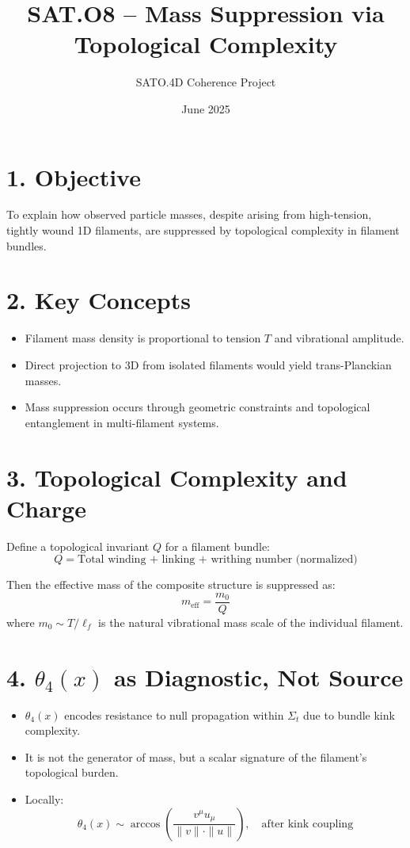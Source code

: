 \documentclass[12pt]{article}
\title{SAT.O8 – Mass Suppression via Topological Complexity}
\author{SATO.4D Coherence Project}
\date{June 2025}
\begin{document}
\maketitle

\section*{1. Objective}

To explain how observed particle masses, despite arising from high-tension, tightly wound 1D filaments, are suppressed by topological complexity in filament bundles.

\section*{2. Key Concepts}

\begin{itemize}
    \item Filament mass density is proportional to tension \( T \) and vibrational amplitude.
    \item Direct projection to 3D from isolated filaments would yield trans-Planckian masses.
    \item Mass suppression occurs through geometric constraints and topological entanglement in multi-filament systems.
\end{itemize}

\section*{3. Topological Complexity and Charge}

Define a topological invariant \( Q \) for a filament bundle:
\[
Q = \text{Total winding + linking + writhing number (normalized)}
\]

Then the effective mass of the composite structure is suppressed as:
\[
m_{\text{eff}} = \frac{m_0}{Q}
\]
where \( m_0 \sim T / \ell_f \) is the natural vibrational mass scale of the individual filament.

\section*{4. \(\theta_4(x)\) as Diagnostic, Not Source}

\begin{itemize}
    \item \(\theta_4(x)\) encodes resistance to null propagation within \( \Sigma_t \) due to bundle kink complexity.
    \item It is not the generator of mass, but a scalar signature of the filament's topological burden.
    \item Locally: 
    \[
    \theta_4(x) \sim \arccos\left( \frac{v^\mu u_\mu}{\|v\| \cdot \|u\|} \right), \quad \text{after kink coupling}
    \]
\end{itemize}
\end{document}
